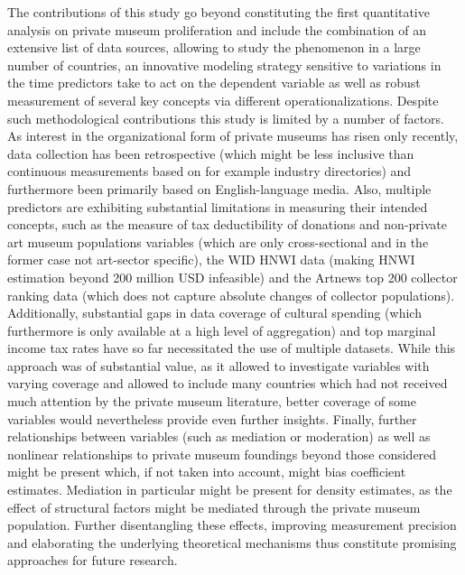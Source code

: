 \documentclass[11pt]{article}
\begin{document}
The contributions of this study go beyond constituting the first quantitative analysis on private museum proliferation and include the combination of an extensive list of data sources, allowing to study the phenomenon in a large number of countries, an innovative modeling strategy sensitive to variations in the time predictors take to act on the dependent variable as well as robust measurement of several key concepts via different operationalizations.
Despite such methodological contributions this study is limited by a number of factors. 
As interest in the organizational form of private museums has risen only recently, data collection has been retrospective (which might be less inclusive than continuous measurements based on for example industry directories) and furthermore been primarily based on English-language media.
Also, multiple predictors are exhibiting substantial limitations in measuring their intended concepts, such as the measure of tax deductibility of donations and non-private art museum populations variables (which are only cross-sectional and in the former case not art-sector specific), the WID HNWI data (making HNWI estimation beyond 200 million USD infeasible) and the Artnews top 200 collector ranking data (which does not capture absolute changes of collector populations).
Additionally, substantial gaps in data coverage of cultural spending (which furthermore is only available at a high level of aggregation) and top marginal income tax rates have so far necessitated the use of multiple datasets.
While this approach was of substantial value, as it allowed to investigate variables with varying coverage and  allowed to include many countries which had not received much attention by the private museum literature, better coverage of some variables would nevertheless provide even further insights.
Finally, further relationships between variables (such as mediation or moderation) as well as nonlinear relationships to private museum foundings beyond those considered might be present which, if not taken into account, might bias coefficient estimates.
Mediation in particular might be present for density estimates, as the effect of structural factors might be mediated through the private museum population.
Further disentangling these effects, improving measurement precision and elaborating the underlying theoretical mechanisms thus constitute promising approaches for future research. 

\begin{sloppypar}
\printbibliography
\end{sloppypar}
\end{document}
